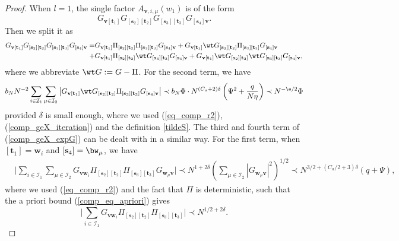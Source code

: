 \begin{proof}
When $l = 1$, the single factor $A_{\mathbf v, i, \mu}(w_1)$ is of the form
\[ G_{\mathbf v[\mathbf t_1]} G_{[\mathbf s_2][\mathbf t_2]} G_{[\mathbf s_3][\mathbf t_3]} G_{[\mathbf s_4]\mathbf v}.\]
Then we split it as
\begin{align}
G_{\mathbf v[\mathbf t_1]} G_{[\mathbf s_2][\mathbf t_2]} G_{[\mathbf s_3][\mathbf t_3]} G_{[\mathbf s_4]\mathbf v}
=& G_{\mathbf v[\mathbf t_1]} \Pi_{[\mathbf s_2][\mathbf t_2]} \Pi_{[\mathbf s_3][\mathbf t_3]} G_{[\mathbf s_4]\mathbf v} + G_{\mathbf v[\mathbf t_1]}\wt G_{[\mathbf s_2][\mathbf t_2]} \Pi_{[\mathbf s_3][\mathbf t_3]}G_{[\mathbf s_4]\mathbf v}\nonumber\\
 + & G_{\mathbf v[\mathbf t_1]} \Pi_{[\mathbf s_2][\mathbf t_2]} \wt G_{[\mathbf s_3][\mathbf t_3]}  G_{[\mathbf s_4]\mathbf v}+ G_{\mathbf v[\mathbf t_1]}\wt G_{[\mathbf s_2][\mathbf t_2]}
\wt G_{[\mathbf s_3][\mathbf t_3]} G_{[\mathbf s_4]\mathbf v},\label{comp_geX_expG}
\end{align}
where we abbreviate $\wt G: = G - \Pi$. For the second term, we have
\begin{align}\label{term11}
b_N N^{-2}\sum_{i\in\mathcal I_1}\sum_{\mu\in\mathcal I_2}\left|G_{\mathbf v[\mathbf t_1]}\wt G_{[\mathbf s_2][\mathbf t_2]} \Pi_{[\mathbf s_3][\mathbf t_3]}G_{[\mathbf s_4]\mathbf v}\right|\prec b_N \Phi \cdot N^{(C_a+2)\delta}\left(\Psi^2 + \frac{q}{N\eta}\right)\prec N^{-\e/2}\Phi
\end{align}
provided $\delta$ is small enough, where we used (\ref{eq_comp_r2}), (\ref{comp_geX_iteration}) and the definition \eqref{tildeS}. The third and fourth term of (\ref{comp_geX_expG}) can be dealt with in a similar way. For the first term, when $[\mathbf t_1]=\mathbf w_i$ and $[\mathbf s_4]=\bw_\mu$, we have
\begin{align*}
& \Big|\sum_{i\in\mathcal I_1}\sum_{\mu\in\mathcal I_2} G_{\mathbf v \mathbf w_i} \Pi_{[\mathbf s_2][\mathbf t_2]}\Pi_{[\mathbf s_3][\mathbf t_3]} G_{\mathbf w_\mu \mathbf v}\Big| \prec N^{1+2\delta}\left(\sum_{\mu\in\mathcal I_2}| G_{\mathbf w_\mu\mathbf v}|^2\right)^{1/2}\prec N^{3/2+(C_a/2+3)\delta}(q+\Psi),
\end{align*}
where we used (\ref{eq_comp_r2}) and the fact that $\Pi$ is deterministic, such that the a priori bound (\ref{comp_eq_apriori}) gives
$$\Big|\sum_{i\in\mathcal I_1} G_{\mathbf v \mathbf w_i} \Pi_{[\mathbf s_2][\mathbf t_2]}\Pi_{[\mathbf s_3][\mathbf t_3]} \Big| \prec N^{1/2+2\delta} .$$

\end{proof}
